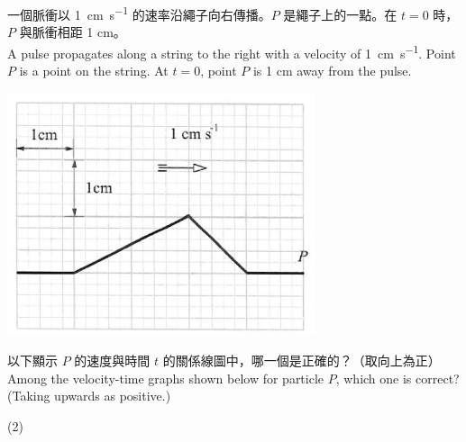{
    一個脈衝以 \qty{1}{cm.s^{-1}} 的速率沿繩子向右傳播。$P$ 是繩子上的一點。在 $t=0$ 時，$P$ 與脈衝相距 1 cm。
    \\A pulse propagates along a string to the right with a velocity of \qty{1}{cm.s^{-1}}. Point $P$ is a point on the string. At $t=0$, point $P$ is 1 cm away from the pulse.
    \par{\par\centering\includegraphics[width=.35\textwidth]{./img/ch1_earlyclass_wave_mc_2024-05-13-20-31-17.png}\par}
    以下顯示 $P$ 的速度與時間 $t$ 的關係線圖中，哪一個是正確的？（取向上為正）
    \\Among the velocity-time graphs shown below for particle $P$, which one is correct? (Taking upwards as positive.)
    \begin{tasks}(2)
        \task {}
        \task {}
        \task {}

\end{tasks}}
